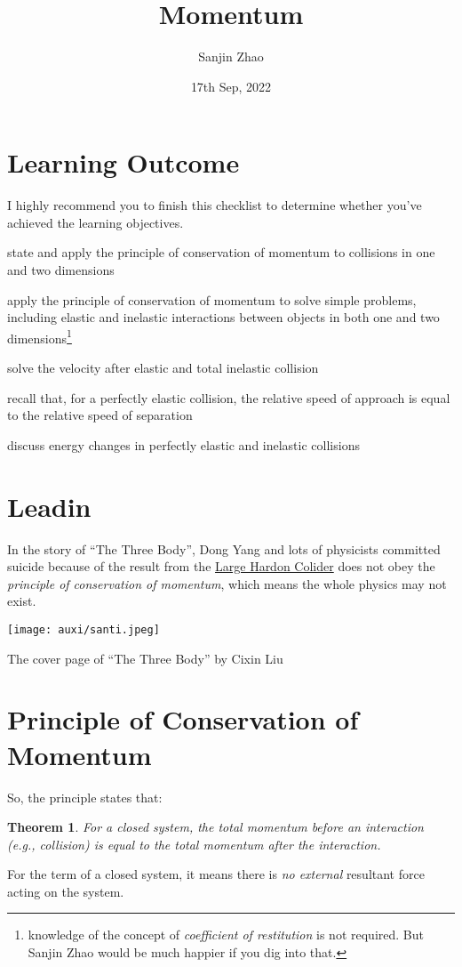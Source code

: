 \documentclass[a4paper]{tufte-handout}
\title{Momentum}
\author{Sanjin Zhao}
\date{17th Sep, 2022}  %
\newtheorem{theorem}{Theorem}[section]      %
\begin{document}
\maketitle%
\section*{Learning Outcome}
I highly recommend you to finish this checklist to determine whether you've achieved the learning objectives.
\begin{todolist}
  \item state and apply the principle of conservation of momentum to collisions in one and two dimensions
  \item apply the principle of conservation of momentum to solve simple problems, including elastic and inelastic interactions between objects in both one and two dimensions\footnote{knowledge of the concept of \emph{coefficient of restitution} is not required. But Sanjin Zhao would be much happier if you dig into that.}
  \item solve the velocity after elastic and total inelastic collision
  \item recall that, for a perfectly elastic collision, the relative speed of approach is equal to the relative speed of separation
  \item discuss energy changes in perfectly elastic and inelastic collisions
\end{todolist}
\clearpage

\section{Leadin}
In the story of ``The Three Body'', Dong Yang and lots of physicists committed suicide because of the result from the \href{https://home.cern/news/news/knowledge-sharing/image-capital-new-exhibition-featuring-cern-science-and-history}{Large Hardon Colider} does not obey the \emph{principle of conservation of momentum}, which means the whole physics may not exist.
\begin{marginfigure}
\texttt{[image: auxi/santi.jpeg]}
\caption{The cover page of ``The Three Body'' by Cixin Liu} 
\end{marginfigure}

\section{Principle of Conservation of Momentum}
So, the principle states that:
\begin{theorem}
For a closed system, the total momentum before an interaction (e.g., collision) is equal to the total momentum after the interaction.
\end{theorem}
For the term of a closed system, it means there is \emph{no external} resultant force acting on the system.
\end{document}
